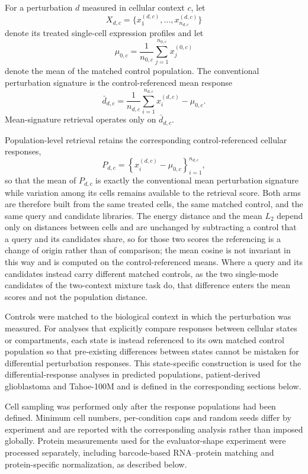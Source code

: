 \documentclass[11pt,letterpaper]{article}
\begin{document}
For a perturbation $d$ measured in cellular context $c$, let
\[
X_{d,c}=\{x^{(d,c)}_1,\ldots,x^{(d,c)}_{n_{d,c}}\}
\]
denote its treated single-cell expression profiles and let
\[
\mu_{0,c}
=
\frac{1}{n_{0,c}}
\sum_{j=1}^{n_{0,c}}x^{(0,c)}_j
\]
denote the mean of the matched control population. The conventional perturbation signature is the control-referenced mean response
\[
\bar d_{d,c}
=
\frac{1}{n_{d,c}}
\sum_{i=1}^{n_{d,c}}x^{(d,c)}_i
-
\mu_{0,c}.
\]
Mean-signature retrieval operates only on $\bar d_{d,c}$.

Population-level retrieval retains the corresponding control-referenced cellular responses,
\[
P_{d,c}
=
\left\{
x^{(d,c)}_i-\mu_{0,c}
\right\}_{i=1}^{n_{d,c}},
\]
so that the mean of $P_{d,c}$ is exactly the conventional mean perturbation signature while variation among its cells remains available to the retrieval score. Both arms are therefore built from the same treated cells, the same matched control, and the same query and candidate libraries. The energy distance and the mean $L_2$ depend only on distances between cells and are unchanged by subtracting a control that a query and its candidates share, so for those two scores the referencing is a change of origin rather than of comparison; the mean cosine is not invariant in this way and is computed on the control-referenced means. Where a query and its candidates instead carry different matched controls, as the two single-mode candidates of the two-context mixture task do, that difference enters the mean scores and not the population distance.

Controls were matched to the biological context in which the perturbation was measured. For analyses that explicitly compare responses between cellular states or compartments, each state is instead referenced to its own matched control population so that pre-existing differences between states cannot be mistaken for differential perturbation responses. This state-specific construction is used for the differential-response analyses in predicted populations, patient-derived glioblastoma and Tahoe-100M and is defined in the corresponding sections below.

Cell sampling was performed only after the response populations had been defined. Minimum cell numbers, per-condition caps and random seeds differ by experiment and are reported with the corresponding analysis rather than imposed globally. Protein measurements used for the evaluator-shape experiment were processed separately, including barcode-based RNA--protein matching and protein-specific normalization, as described below.
\end{document}
